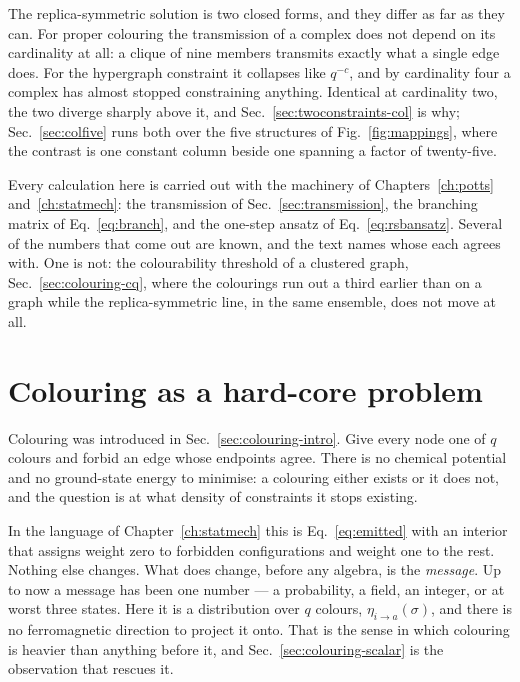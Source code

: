 The replica-symmetric solution is two closed forms, and they differ as far as
they can. For proper colouring the transmission of a complex does not depend on
its cardinality at all: a clique of nine members transmits exactly what a single
edge does. For the hypergraph constraint it collapses like $q^{-c}$, and by
cardinality four a complex has almost stopped constraining anything. Identical
at cardinality two, the two diverge sharply above it, and
Sec.~\ref{sec:twoconstraints-col} is why; Sec.~\ref{sec:colfive} runs both
over the five structures of Fig.~\ref{fig:mappings}, where the contrast is one
constant column beside one spanning a factor of twenty-five.

Every calculation here is carried out with the machinery of
Chapters~\ref{ch:potts} and~\ref{ch:statmech}: the transmission of
Sec.~\ref{sec:transmission}, the branching matrix of Eq.~\eqref{eq:branch},
and the one-step ansatz of Eq.~\eqref{eq:rsbansatz}. Several of the numbers
that come out are known, and the text names whose each agrees with. One is not:
the colourability threshold of a clustered graph, Sec.~\ref{sec:colouring-cq},
where the colourings run out a third earlier than on a graph while the
replica-symmetric line, in the same ensemble, does not move at all.

\section{Colouring as a hard-core problem}
\label{sec:colouringdef}

Colouring was introduced in Sec.~\ref{sec:colouring-intro}. Give every node one
of $q$ colours and forbid an edge whose endpoints agree.
There is no chemical potential and no ground-state energy to minimise: a
colouring either exists or it does not, and the question is at what density of
constraints it stops existing.

In the language of Chapter~\ref{ch:statmech} this is
Eq.~\eqref{eq:emitted} with an interior that assigns weight zero to forbidden
configurations and weight one to the rest. Nothing else changes. What does
change, before any algebra, is the \emph{message}. Up to now a message has been one number --- a probability, a field, an integer, or
at worst three states. Here it is a distribution over $q$ colours,
$\eta_{i\to a}(\sigma)$, and there is no ferromagnetic direction to project it
onto. That is the sense in which colouring is heavier than anything before it,
and Sec.~\ref{sec:colouring-scalar} is the observation that rescues it.

